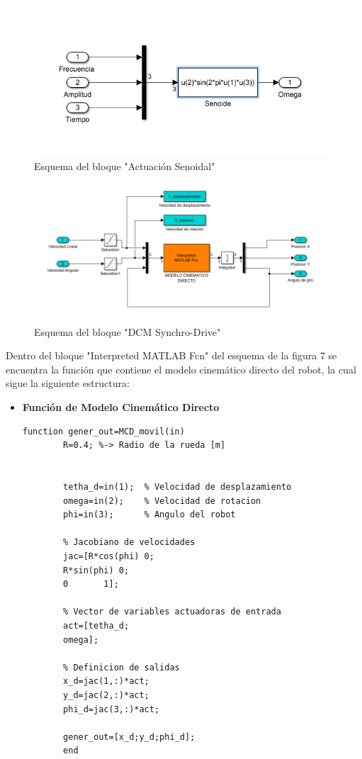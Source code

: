 \documentclass[a4paper,twoside]{article}
\begin{document}
	\begin{figure}[H]
		\centering
		\includegraphics[width=1\textwidth]{simulink_MCD_2}
		\caption{Esquema del bloque "Actuación Senoidal"}
	\end{figure}

	\begin{figure}[H]
		\centering
		\includegraphics[width=1.2\textwidth]{simulink_MCD_3}
		\caption{Esquema del bloque "DCM Synchro-Drive"}
	\end{figure}

	Dentro del bloque "Interpreted MATLAB Fcn" del esquema de la figura 7 se encuentra la función que contiene el modelo cinemático directo del robot, la cual sigue la siguiente estructura:
	
	\begin{itemize}
		\item \textbf{Función de Modelo Cinemático Directo} 
		\lstset{language=Matlab,columns=flexible,keepspaces=true}
		
		\begin{lstlisting}[frame=single]
		function gener_out=MCD_movil(in) 
		R=0.4; %-> Radio de la rueda [m]
		
		
		tetha_d=in(1);  % Velocidad de desplazamiento
		omega=in(2);    % Velocidad de rotacion
		phi=in(3);      % Angulo del robot
		
		% Jacobiano de velocidades
		jac=[R*cos(phi) 0;
		R*sin(phi) 0;
		0       1];
		
		% Vector de variables actuadoras de entrada
		act=[tetha_d;
		omega];
		
		% Definicion de salidas
		x_d=jac(1,:)*act;
		y_d=jac(2,:)*act;
		phi_d=jac(3,:)*act;
		
		gener_out=[x_d;y_d;phi_d];
		end
		\end{lstlisting} 
	\end{itemize}
\end{document}
